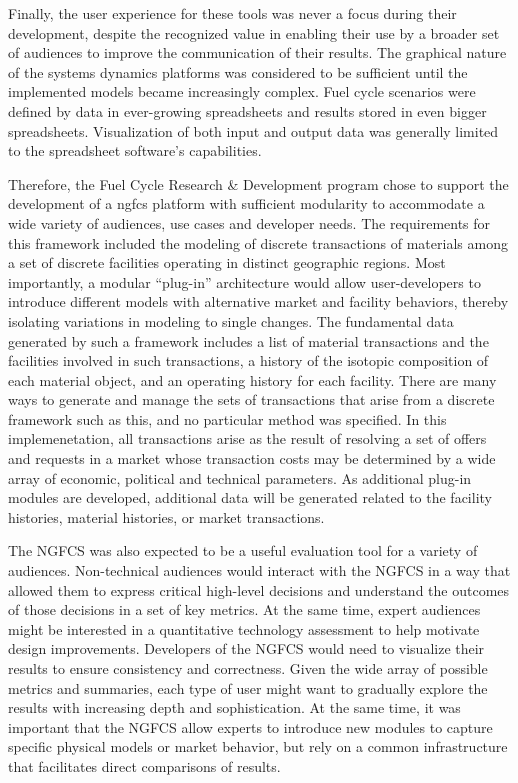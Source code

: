 Finally, the user experience for these tools was never a focus during their
development, despite the recognized value in enabling their use by a broader
set of audiences to improve the communication of their results.  The graphical
nature of the systems dynamics platforms was considered to be sufficient until
the implemented models became increasingly complex.  Fuel cycle scenarios were
defined by data in ever-growing spreadsheets and results stored in even bigger
spreadsheets.  Visualization of both input and output data was generally
limited to the spreadsheet software's capabilities.

Therefore, the Fuel Cycle Research \& Development program chose to support the
development of a \gls{ngfcs} platform with sufficient modularity to
accommodate a wide variety of audiences, use cases and developer needs. The
requirements for this framework included the modeling of discrete transactions
of materials among a set of discrete facilities operating in distinct
geographic regions.  Most importantly, a modular “plug-in” architecture would
allow user-developers to introduce different models with alternative market
and facility behaviors, thereby isolating variations in modeling to single
changes. The fundamental data generated by such a framework includes a list of
material transactions and the facilities involved in such transactions, a
history of the isotopic composition of each material object, and an operating
history for each facility. There are many ways to generate and manage the sets
of transactions that arise from a discrete framework such as this, and no
particular method was specified.  In this implemenetation, all transactions
arise as the result of resolving a set of offers and requests in a market
whose transaction costs may be determined by a wide array of economic,
political and technical parameters. As additional plug-in modules are
developed, additional data will be generated related to the facility
histories, material histories, or market transactions.

The NGFCS was also expected to be a useful evaluation tool for a variety of
audiences.  Non-technical audiences would interact with the NGFCS in a way
that allowed them to express critical high-level decisions and understand the
outcomes of those decisions in a set of key metrics. At the same time, expert
audiences might be interested in a quantitative technology assessment to help
motivate design improvements. Developers of the NGFCS would need to visualize
their results to ensure consistency and correctness. Given the wide array of
possible metrics and summaries, each type of user might want to gradually
explore the results with increasing depth and sophistication. At the same
time, it was important that the NGFCS allow experts to introduce new modules
to capture specific physical models or market behavior, but rely on a common
infrastructure that facilitates direct comparisons of results.

